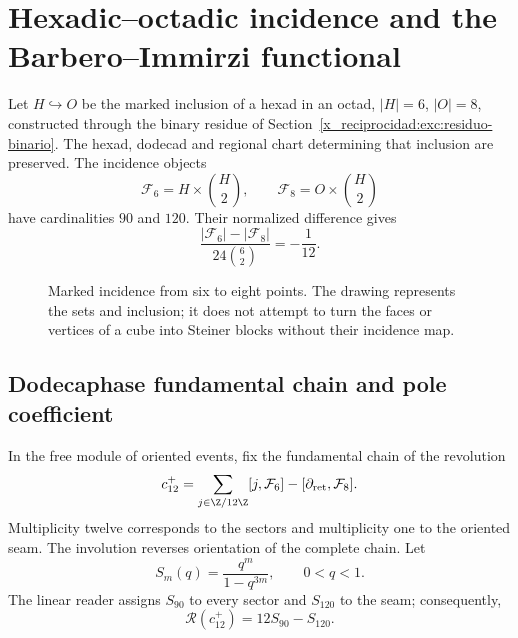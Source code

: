 \chapter{Hexadic--octadic incidence and the Barbero--Immirzi functional}
\label{x_reciprocidad:v:ant:sec:barbero}
Let $H\hookrightarrow O$ be the marked inclusion of a hexad in an octad,
$|H|=6$, $|O|=8$, constructed through the binary residue of
Section~\ref{x_reciprocidad:exc:residuo-binario}. The hexad, dodecad
and regional chart determining that inclusion are preserved.
The incidence objects
\[
\mathcal F_6=H\times\binom H2,\qquad
\mathcal F_8=O\times\binom H2
\]
have cardinalities $90$ and $120$. Their normalized difference gives
\[
\frac{|\mathcal F_6|-|\mathcal F_8|}{24\binom62}=-\frac1{12}.
\]
\begin{figure}[htbp]
\centering
{}
\caption{Marked incidence from six to eight points. The drawing represents the sets and inclusion; it does not attempt to turn the faces or vertices of a cube into Steiner blocks without their incidence map.}
\end{figure}

\section{Dodecaphase fundamental chain and pole coefficient}
In the free module of oriented events, fix the fundamental
chain of the revolution
\[
c_{12}^{+}=
\sum_{j\in\Z/12\Z}[j,\mathcal F_6]
-[\partial_{\rm ret},\mathcal F_8].
\]
Multiplicity twelve corresponds to the sectors and multiplicity one to the oriented seam. The involution reverses orientation of the complete chain. Let
\[
S_m(q)=\frac{q^m}{1-q^{3m}},\qquad 0<q<1.
\]
The linear reader assigns $S_{90}$ to every sector and $S_{120}$ to the seam; consequently,
\[
\mathscr R(c_{12}^{+})=12S_{90}-S_{120}.
\]

